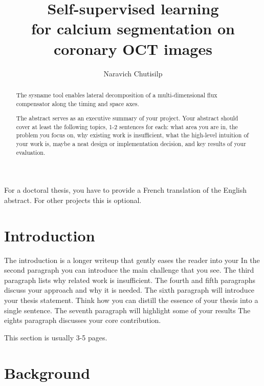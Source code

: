 \documentclass[a4paper,11pt,oneside]{report}
\title{Self-supervised learning\\for calcium segmentation on coronary OCT images}
\author{Naravich Chutisilp}
\begin{document}
\maketitle
\makededication
\makeacks

\begin{abstract}
The sysname tool enables lateral decomposition of a multi-dimensional
flux compensator along the timing and space axes.

The abstract serves as an executive summary of your project.
Your abstract should cover at least the following topics, 1-2 sentences for
each: what area you are in, the problem you focus on, why existing work is
insufficient, what the high-level intuition of your work is, maybe a neat
design or implementation decision, and key results of your evaluation.
\end{abstract}

\begin{frenchabstract}
For a doctoral thesis, you have to provide a French translation of the
English abstract. For other projects this is optional.
\end{frenchabstract}

\maketoc

\chapter{Introduction}

The introduction is a longer writeup that gently eases the reader into your
In the second paragraph you can introduce the main challenge that you see.
The third paragraph lists why related work is insufficient.
The fourth and fifth paragraphs discuss your approach and why it is needed.
The sixth paragraph will introduce your thesis statement. Think how you can
distill the essence of your thesis into a single sentence.
The seventh paragraph will highlight some of your results
The eights paragraph discusses your core contribution.

This section is usually 3-5 pages.

\chapter{Background}

\end{document}
